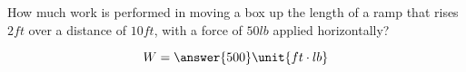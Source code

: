 \documentclass{ximera}
\author{Gregory Hartman \and Matthew Carr}
\begin{document}
\begin{exercise}




How much work is performed in moving a box up the length of a ramp that rises $2\unit{ft}$ over a distance of $10\unit{ft}$, with a force of $50\unit{lb}$ applied horizontally?

\begin{prompt}
\[
W=\answer{500}\unit{ft\cdot lb}
\]
\end{prompt}

\end{exercise}
\end{document}
